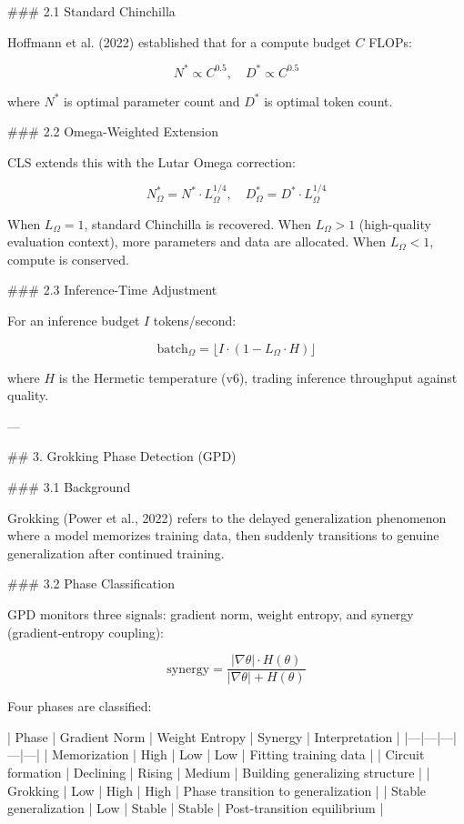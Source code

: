 ### 2.1 Standard Chinchilla

Hoffmann et al. (2022) established that for a compute budget \( C \) FLOPs:

\[
N^* \propto C^{0.5}, \quad D^* \propto C^{0.5}
\]

where \( N^* \) is optimal parameter count and \( D^* \) is optimal token count.

### 2.2 Omega-Weighted Extension

CLS extends this with the Lutar Omega correction:

\[
N^*_\Omega = N^* \cdot L_\Omega^{1/4}, \quad D^*_\Omega = D^* \cdot L_\Omega^{1/4}
\]

When \( L_\Omega = 1 \), standard Chinchilla is recovered. When \( L_\Omega > 1 \) (high-quality evaluation context), more parameters and data are allocated. When \( L_\Omega < 1 \), compute is conserved.

### 2.3 Inference-Time Adjustment

For an inference budget \( I \) tokens/second:

\[
\text{batch}_\Omega = \lfloor I \cdot (1 - L_\Omega \cdot H) \rfloor
\]

where \( H \) is the Hermetic temperature (v6), trading inference throughput against quality.

---

## 3. Grokking Phase Detection (GPD)

### 3.1 Background

Grokking (Power et al., 2022) refers to the delayed generalization phenomenon where a model memorizes training data, then suddenly transitions to genuine generalization after continued training.

### 3.2 Phase Classification

GPD monitors three signals: gradient norm, weight entropy, and synergy (gradient-entropy coupling):

\[
\text{synergy} = \frac{|\nabla \theta| \cdot H(\theta)}{|\nabla \theta| + H(\theta)}
\]

Four phases are classified:

| Phase | Gradient Norm | Weight Entropy | Synergy | Interpretation |
|---|---|---|---|---|
| Memorization | High | Low | Low | Fitting training data |
| Circuit formation | Declining | Rising | Medium | Building generalizing structure |
| Grokking | Low | High | High | Phase transition to generalization |
| Stable generalization | Low | Stable | Stable | Post-transition equilibrium |

